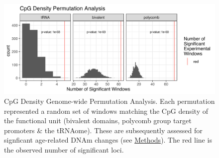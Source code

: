 \documentclass[]{book}
\begin{document}
\begin{figure}

{\centering \includegraphics[width=1\linewidth]{figs/tRNA-poly-bivP_n1000_combined_perm_hist} 

}

\caption{CpG Density Genome-wide Permutation Analysis. Each permutation represented a random set of windows matching the CpG density of the functional unit (bivalent domains, polycomb group target promoters \& the tRNAome). These are subsequently assessed for signficant age-related DNAm changes (see \protect\hyperlink{AgeErichmentPermutation}{Methods}). The red line is the observed number of significant loci.}\label{fig:permHists}
\end{figure}



\begin{table}[t]

\caption{\label{tab:GWSBBtRNAsTab}Significantly Hypermethylating tRNAs in blood cell-type and batch corrected model MeDIP-seq. `Slope' corresponds to the beta value for methylation in the linear model.}
\centering
{}
\end{table}
\end{document}
